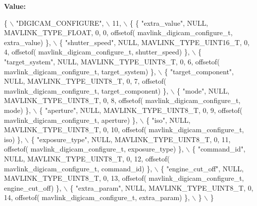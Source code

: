 {\bfseries Value\+:}
\begin{DoxyCode}
\{ \(\backslash\)
    \textcolor{stringliteral}{"DIGICAM\_CONFIGURE"}, \(\backslash\)
    11, \(\backslash\)
    \{  \{ \textcolor{stringliteral}{"extra\_value"}, NULL, MAVLINK_TYPE_FLOAT, 0, 0, offsetof(
      mavlink_digicam_configure_t, extra\_value) \}, \(\backslash\)
         \{ \textcolor{stringliteral}{"shutter\_speed"}, NULL, MAVLINK_TYPE_UINT16_T, 0, 4, offsetof(
      mavlink_digicam_configure_t, shutter\_speed) \}, \(\backslash\)
         \{ \textcolor{stringliteral}{"target\_system"}, NULL, MAVLINK_TYPE_UINT8_T, 0, 6, offsetof(
      mavlink_digicam_configure_t, target\_system) \}, \(\backslash\)
         \{ \textcolor{stringliteral}{"target\_component"}, NULL, MAVLINK_TYPE_UINT8_T, 0, 7, offsetof(
      mavlink_digicam_configure_t, target\_component) \}, \(\backslash\)
         \{ \textcolor{stringliteral}{"mode"}, NULL, MAVLINK_TYPE_UINT8_T, 0, 8, offsetof(
      mavlink_digicam_configure_t, mode) \}, \(\backslash\)
         \{ \textcolor{stringliteral}{"aperture"}, NULL, MAVLINK_TYPE_UINT8_T, 0, 9, offsetof(
      mavlink_digicam_configure_t, aperture) \}, \(\backslash\)
         \{ \textcolor{stringliteral}{"iso"}, NULL, MAVLINK_TYPE_UINT8_T, 0, 10, offsetof(
      mavlink_digicam_configure_t, iso) \}, \(\backslash\)
         \{ \textcolor{stringliteral}{"exposure\_type"}, NULL, MAVLINK_TYPE_UINT8_T, 0, 11, offsetof(
      mavlink_digicam_configure_t, exposure\_type) \}, \(\backslash\)
         \{ \textcolor{stringliteral}{"command\_id"}, NULL, MAVLINK_TYPE_UINT8_T, 0, 12, offsetof(
      mavlink_digicam_configure_t, command\_id) \}, \(\backslash\)
         \{ \textcolor{stringliteral}{"engine\_cut\_off"}, NULL, MAVLINK_TYPE_UINT8_T, 0, 13, offsetof(
      mavlink_digicam_configure_t, engine\_cut\_off) \}, \(\backslash\)
         \{ \textcolor{stringliteral}{"extra\_param"}, NULL, MAVLINK_TYPE_UINT8_T, 0, 14, offsetof(
      mavlink_digicam_configure_t, extra\_param) \}, \(\backslash\)
         \} \(\backslash\)
\}
\end{DoxyCode}
\mbox{\label{mavlink__msg__digicam__configure_8h_acd4bc14bc81690e3d7ab35ea900771bb}} 
